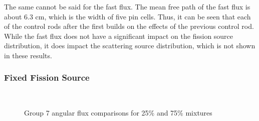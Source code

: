 The same cannot be said for the fast flux.  The mean free path of the fast flux is about 6.3 cm, which is the width of five pin cells.  Thus, it can be seen that each of the control rods after the first builds on the effects of the previous control rod.  While the fast flux does not have a significant impact on the fission source distribution, it does impact the scattering source distribution, which is not shown in these results.

\subsubsection{Fixed Fission Source}

\begin{figure}[H]
  \centering
  \hfill
  ~
  \caption{Group 7 angular flux comparisons for 25\% and 75\% mixtures}\label{f:1dmoc-angflux7}
\end{figure}


